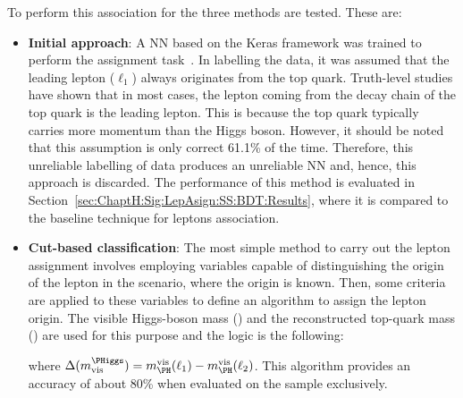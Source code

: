 To perform this association for the \dilepSStau three methods %
are tested. These are: %
\begin{itemize}
	\item \textbf{Initial approach}:  A NN based on the Keras framework 
	was trained to perform the assignment task~\cite{Walther:2743809}. 
	In labelling the data, it was assumed 
	that the leading lepton ($\ell_{1}$) always originates from the top quark. Truth-level studies have 
	shown that in most cases, the lepton coming from the decay chain of the top quark 
	is the leading lepton. This is because the top quark typically carries more momentum 
	than the Higgs boson. However, it should be noted that this assumption is only correct 
	61.1\% of the time. Therefore, this unreliable labelling of data produces an unreliable
	NN and, hence, this approach is discarded.
	The performance of this method is evaluated in Section~\ref{sec:ChaptH:Sig:LepAsign:SS:BDT:Results},
	where it is compared to the baseline technique for leptons association. 
	
	
	\item \textbf{Cut-based classification}: The most simple method to carry 
	out the lepton assignment involves employing variables capable of distinguishing 
	the origin of the lepton in the \dilepOStau scenario, where the origin is known. 
	Then, some criteria are applied to these variables to define an algorithm to
	assign the lepton origin. The visible Higgs-boson mass (\Hvismass) and the reconstructed 
	top-quark mass (\toprecomass) are used for this purpose and the logic is the following:
	
	where $\Delta(m_{\text{vis}}^{\PHiggs}) = \Hvismass(\ell_{1}) - \Hvismass(\ell_{2})$. 
	This algorithm provides an accuracy of about 80\% when evaluated on the
	\dilepOStau sample exclusively.


\end{itemize}
